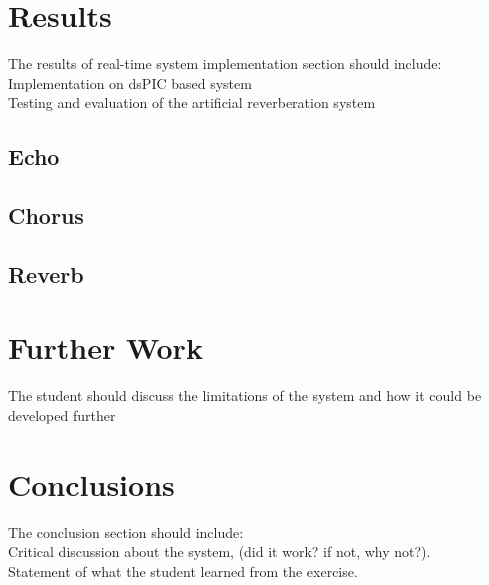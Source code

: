 \documentclass{scrartcl}
\begin{document}
    \section{Results}
    The results of real-time system implementation section should include:\\
        Implementation on dsPIC based system\\
        Testing and evaluation of the artificial reverberation system\\
        \subsection{Echo}
        \subsection{Chorus}
        \subsection{Reverb}
        
    \section{Further Work}
    The student should discuss the limitations of the system and how it could be developed further

    \section{Conclusions}
    The conclusion section should include:\\
        Critical discussion about the system, (did it work? if not, why
        not?).\\
        Statement of what the student learned from the exercise.\\

    \printbibliography
\end{document}
